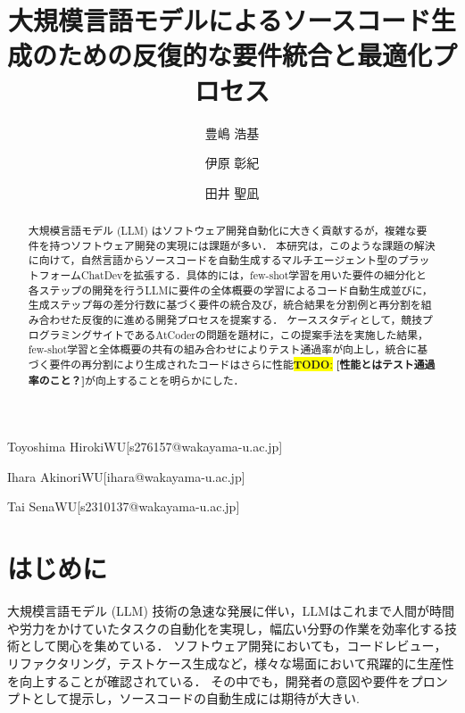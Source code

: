 \documentclass[submit,techrep,noauthor]{ipsj}
\newcommand{\todo}[1]{\colorbox{yellow}{{\bf TODO}:}{\color{red} {\textbf{[#1]}}}}
\begin{document}
\title{大規模言語モデルによるソースコード生成のための反復的な要件統合と最適化プロセス}



\author{豊嶋 浩基}{Toyoshima Hiroki}{WU}[s276157@wakayama-u.ac.jp]
\author{伊原 彰紀}{Ihara Akinori}{WU}[ihara@wakayama-u.ac.jp]
\author{田井 聖凪}{Tai Sena}{WU}[s2310137@wakayama-u.ac.jp]

\begin{abstract}
大規模言語モデル (LLM) はソフトウェア開発自動化に大きく貢献するが，複雑な要件を持つソフトウェア開発の実現には課題が多い．
本研究は，このような課題の解決に向けて，自然言語からソースコードを自動生成するマルチエージェント型のプラットフォームChatDevを拡張する．具体的には，few-shot学習を用いた要件の細分化と各ステップの開発を行うLLMに要件の全体概要の学習によるコード自動生成並びに，生成ステップ毎の差分行数に基づく要件の統合及び，統合結果を分割例と再分割を組み合わせた反復的に進める開発プロセスを提案する．
ケーススタディとして，競技プログラミングサイトであるAtCoderの問題を題材に，この提案手法を実施した結果，few-shot学習と全体概要の共有の組み合わせによりテスト通過率が向上し，統合に基づく要件の再分割により生成されたコードはさらに性能\todo{性能とはテスト通過率のこと？}が向上することを明らかにした．

\end{abstract}

\maketitle

\section{はじめに}

大規模言語モデル (LLM) 技術の急速な発展に伴い\cite{Growing_LLM}，LLMはこれまで人間が時間や労力をかけていたタスクの自動化を実現し，幅広い分野の作業を効率化する技術として関心を集めている．
ソフトウェア開発においても，コードレビュー，リファクタリング，テストケース生成など，様々な場面において飛躍的に生産性を向上することが確認されている\cite{LLM_CodeReview}\cite{LLM_Refactoring}\cite{LLM_Gene_Test}．
その中でも，開発者の意図や要件をプロンプトとして提示し，ソースコードの自動生成には期待が大きい\cite{LLM_CodeGeneration}.
\end{document}
